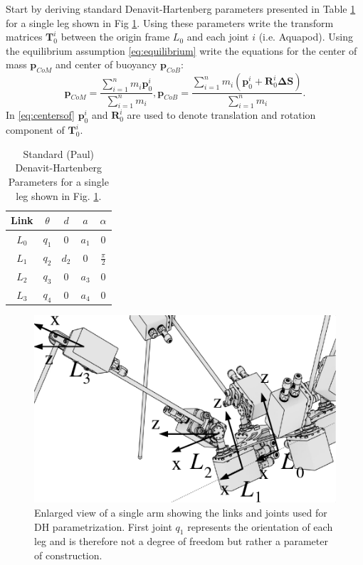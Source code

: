 Start by deriving standard Denavit-Hartenberg parameters presented in Table \ref{tab:DHParameters} for a single leg shown in Fig \ref{fig:DHParameters}. Using these parameters write the transform matrices $\textbf{T}_0^i$ between the origin frame $L_0$ and each joint $i$ (i.e. Aquapod). Using the equilibrium assumption \eqref{eq:equilibrium} write the equations for the center of mass $\textbf{p}_{CoM}$ and center of buoyancy $\textbf{p}_{CoB}$:
\begin{equation}\label{eq:centersof}
\textbf{p}_{CoM} = \frac{\sum_{i=1}^n m_i \textbf{p}_0^i}{\sum_{i=1}^n m_i},\textbf{p}_{CoB} = \frac{\sum_{i=1}^n m_i( \textbf{p}_0^i+\textbf{R}_0^i \boldsymbol{\Delta}\textbf{S})}{\sum_{i=1}^n m_i}.
\end{equation} 
In \eqref{eq:centersof}  $\textbf{p}_0^i$ and $\textbf{R}_0^i$ are used to denote translation and rotation component of $\textbf{T}_0^i$.

\begin{table}[!t]
	\centering
	\caption{{Standard (Paul)} Denavit-Hartenberg Parameters for a single leg shown in Fig. \ref{fig:DHParameters}.}\label{tab:DHParameters}
	\begin{tabular}{ccccc}
		Link & $\theta$ & $d$ & $a$ & $\alpha$ \\\hline
		$L_0$ & $q_1$ & $0$ & $a_1$ & $0$\\
		$L_1$ & $q_2$ & $d_2$ & $0$ & $\frac{\pi}{2}$\\
		$L_2$ & $q_3$ & $0$ & $a_3$ & $0$\\
		$L_3$ & $q_4$ & $0$ & $a_4$ & $0$
	\end{tabular}
\end{table}

\begin{figure}[t!]
	\centering
	\includegraphics[width=0.8\columnwidth]{./img/DHParameters.pdf}
	\caption{Enlarged view of a single arm showing the links and joints used for DH parametrization. First joint $q_1$ represents the orientation of each leg and is therefore not a degree of freedom but rather a parameter of construction.}
	\label{fig:DHParameters}
\end{figure}

